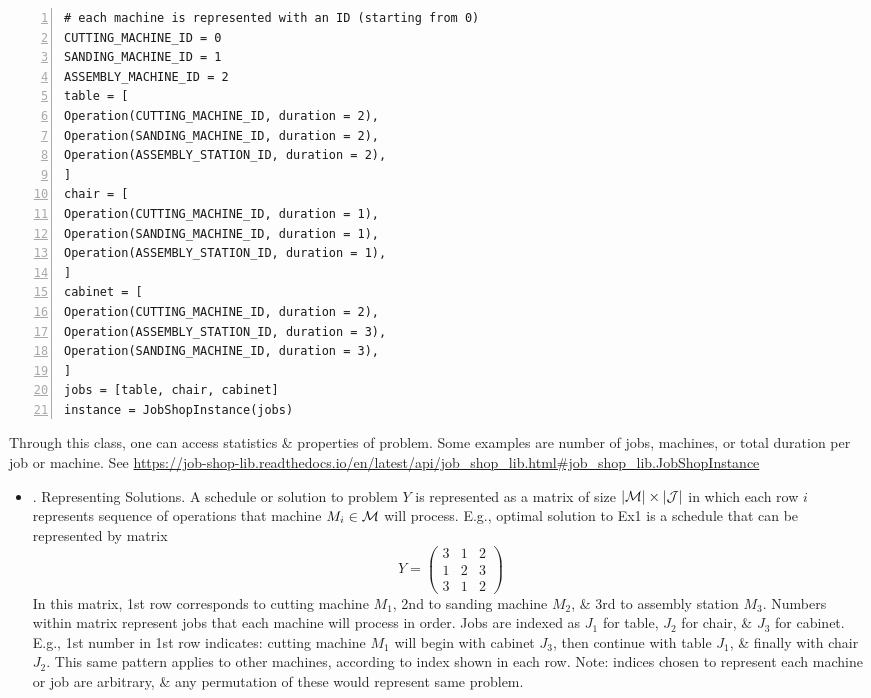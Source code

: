 \documentclass{article}
\begin{document}
\begin{itemize}
\begin{Verbatim}[numbers=left,xleftmargin=5mm]
# each machine is represented with an ID (starting from 0)
CUTTING_MACHINE_ID = 0
SANDING_MACHINE_ID = 1
ASSEMBLY_MACHINE_ID = 2
table = [
Operation(CUTTING_MACHINE_ID, duration = 2),
Operation(SANDING_MACHINE_ID, duration = 2),
Operation(ASSEMBLY_STATION_ID, duration = 2),
]
chair = [
Operation(CUTTING_MACHINE_ID, duration = 1),
Operation(SANDING_MACHINE_ID, duration = 1),
Operation(ASSEMBLY_STATION_ID, duration = 1),
]
cabinet = [
Operation(CUTTING_MACHINE_ID, duration = 2),
Operation(ASSEMBLY_STATION_ID, duration = 3),
Operation(SANDING_MACHINE_ID, duration = 3),
]
jobs = [table, chair, cabinet]
instance = JobShopInstance(jobs)
    \end{Verbatim}
    Through this class, one can access statistics \& properties of problem. Some examples are number of jobs, machines, or total duration per job or machine. See \url{https://job-shop-lib.readthedocs.io/en/latest/api/job_shop_lib.html#job_shop_lib.JobShopInstance}
    \begin{itemize}
        \item {. Representing Solutions.} A schedule or solution to problem $Y$ is represented as a matrix of size $|{\cal M}|\times|{\cal J}|$ in which each row $i$ represents sequence of operations that machine $M_i\in{\cal M}$ will process. E.g., optimal solution to Ex1 is a schedule that can be represented by matrix
        \begin{equation*}
            Y = \begin{pmatrix}
                3 & 1 & 2\\1 & 2 & 3\\3 & 1 & 2
            \end{pmatrix}
        \end{equation*}
        In this matrix, 1st row corresponds to cutting machine $M_1$, 2nd to sanding machine $M_2$, \& 3rd to assembly station $M_3$. Numbers within matrix represent jobs that each machine will process in order. Jobs are indexed as $J_1$ for table, $J_2$ for chair, \& $J_3$ for cabinet. E.g., 1st number in 1st row indicates: cutting machine $M_1$ will begin with cabinet $J_3$, then continue with table $J_1$, \& finally with chair $J_2$. This same pattern applies to other machines, according to index shown in each row. Note: indices chosen to represent each machine or job are arbitrary, \& any permutation of these would represent same problem.


\end{itemize}
\end{itemize}
\end{document}
